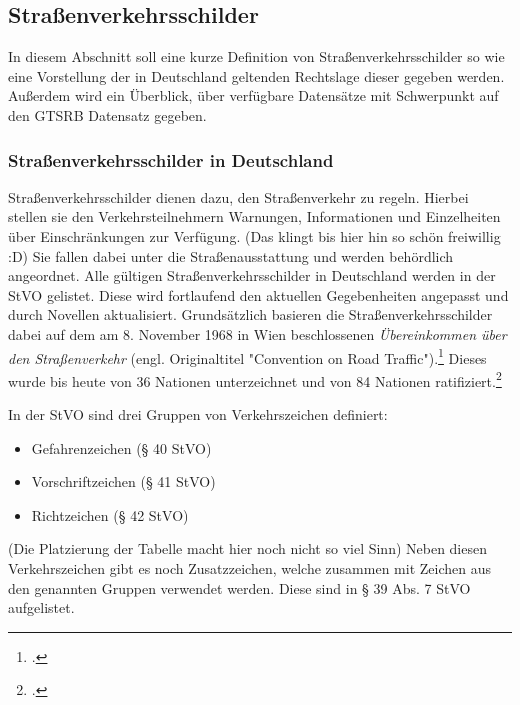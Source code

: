 \subsection{Straßenverkehrsschilder}
In diesem Abschnitt soll eine kurze Definition von Straßenverkehrsschilder so wie eine Vorstellung der in Deutschland geltenden Rechtslage dieser gegeben werden. Außerdem wird ein Überblick, über verfügbare Datensätze mit Schwerpunkt auf den \ac{GTSRB} Datensatz gegeben.

\subsubsection{Straßenverkehrsschilder in Deutschland}
Straßenverkehrsschilder dienen dazu, den Straßenverkehr zu regeln. Hierbei stellen sie den Verkehrsteilnehmern Warnungen, Informationen und Einzelheiten über Einschränkungen zur Verfügung. (Das klingt bis hier hin so schön freiwillig :D) Sie fallen dabei unter die Straßenausstattung und werden behördlich angeordnet.  Alle gültigen Straßenverkehrsschilder in Deutschland werden in der \ac{StVO} gelistet. Diese wird fortlaufend den aktuellen Gegebenheiten angepasst und durch Novellen aktualisiert. Grundsätzlich basieren die Straßenverkehrsschilder dabei auf dem am 8. November 1968 in Wien beschlossenen \textit{Übereinkommen über den Straßenverkehr} (engl. Originaltitel "Convention on Road Traffic").\footcite[Vgl.][o.S.]{unConventionRoadTraffic1977} 
 Dieses wurde bis heute von 36 Nationen unterzeichnet und von 84 Nationen ratifiziert.\footcite[Vgl.][1-14]{unUnitedNationsTreaty2020}

In der \ac{StVO} sind drei Gruppen von Verkehrszeichen definiert:
\begin{itemize}
    \item Gefahrenzeichen (§ 40 \ac{StVO})
    \item Vorschriftzeichen (§ 41 \ac{StVO})
    \item Richtzeichen (§ 42 \ac{StVO})
\end{itemize}

(Die Platzierung der Tabelle macht hier noch nicht so viel Sinn) Neben diesen Verkehrszeichen gibt es noch Zusatzzeichen, welche zusammen mit Zeichen aus den genannten Gruppen verwendet werden. Diese sind in § 39 Abs. 7 \ac{StVO} aufgelistet.


